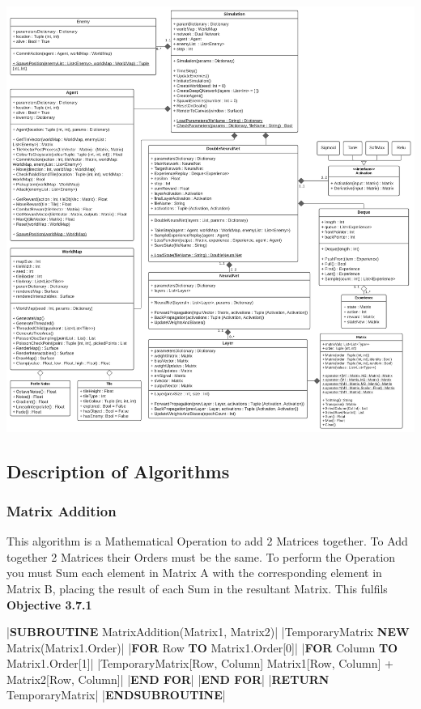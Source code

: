 \begin{flushleft}
            \pagebreak
            \vspace{0.5cm}
            \centerline{\includegraphics[width=18cm]{Images/Design/ClassDiagram.png}}
            \vspace{0.5cm}
            \pagebreak
        \subsection{Description of Algorithms}
            \subsubsection{Matrix Addition}
                This algorithm is a Mathematical Operation to add 2 Matrices together. To Add together 2 Matrices their Orders
                must be the same. To perform the Operation you must Sum each element in Matrix A with the corresponding element 
                in Matrix B, placing the result of each Sum in the resultant Matrix. This fulfils \textbf{Objective 3.7.1}

                \vspace{0.2cm}
                \begin{pseudocode}
|\textbf{SUBROUTINE} MatrixAddition(Matrix1, Matrix2)|
    |TemporaryMatrix \leftarrow \textbf{NEW} Matrix(Matrix1.Order)|
    |\textbf{FOR} Row  \textbf{TO} Matrix1.Order[0]|
        |\textbf{FOR} Column  \textbf{TO} Matrix1.Order[1]|
            |TemporaryMatrix[Row, Column] \leftarrow Matrix1[Row, Column] + Matrix2[Row, Column]|
        |\textbf{END FOR}|
    |\textbf{END FOR}|
    |\textbf{RETURN} TemporaryMatrix|
|\textbf{ENDSUBROUTINE}|
                \end{pseudocode}


\end{flushleft}
